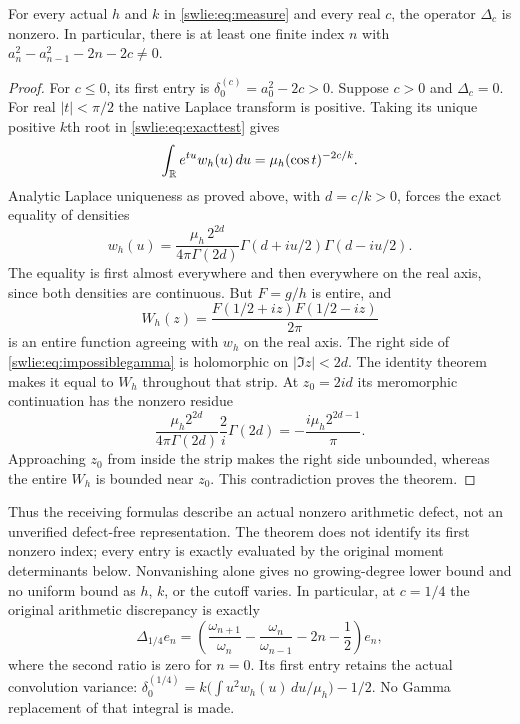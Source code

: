 \begin{swlietheorem}
\label{swlie:thm:nonzero}
For every actual $h$ and $k$ in \eqref{swlie:eq:measure} and every
real $c$, the operator $\Delta_c$ is nonzero. In particular,
there is at least one finite index $n$ with
$a_n^2-a_{n-1}^2-2n-2c\ne0$.
\end{swlietheorem}
\begin{proof}
For $c\leq0$, its first entry is
$\delta_0^{(c)}=a_0^2-2c>0$.
Suppose $c>0$ and $\Delta_c=0$.
For real $|t|<\pi/2$ the native Laplace transform is positive.
Taking its unique positive $k$th root in
\eqref{swlie:eq:exacttest} gives
\[
 \int_\mathbb R e^{tu}w_h(u)\,du
       =\mu_h(\cos t)^{-2c/k}.
\]
Analytic Laplace uniqueness as proved above, with
$d=c/k>0$, forces the exact equality of densities
\begin{equation}\label{swlie:eq:impossiblegamma}
 w_h(u)=\frac{\mu_h\,2^{2d}}{4\pi\Gamma(2d)}
                \Gamma(d+iu/2)\Gamma(d-iu/2).
\end{equation}
The equality is first almost everywhere and then everywhere
on the real axis, since both densities are continuous.
But $F=g/h$ is entire, and
\[
 W_h(z)=\frac{F(1/2+iz)F(1/2-iz)}{2\pi}
\]
is an entire function agreeing with $w_h$ on the real axis.
The right side of \eqref{swlie:eq:impossiblegamma} is holomorphic
on $|\Im z|<2d$. The identity theorem makes it equal to
$W_h$ throughout that strip. At $z_0=2id$ its meromorphic
continuation has the nonzero residue
\[
 \frac{\mu_h2^{2d}}{4\pi\Gamma(2d)}
       \frac{2}{i}\Gamma(2d)
       =-\frac{i\mu_h2^{2d-1}}{\pi}.
\]
Approaching $z_0$ from inside the strip makes the right
side unbounded, whereas the entire $W_h$ is bounded near
$z_0$. This contradiction proves the theorem.
\end{proof}

Thus the receiving formulas describe an actual nonzero
arithmetic defect, not an unverified defect-free
representation. The theorem does not identify its first
nonzero index; every entry is exactly evaluated by the
original moment determinants below. Nonvanishing alone
gives no growing-degree lower bound and no uniform bound
as $h$, $k$, or the cutoff varies.
In particular, at $c=1/4$ the original arithmetic discrepancy
is exactly
\begin{equation}\label{swlie:eq:archdefect}
 \boxed{\quad
 \Delta_{1/4}e_n=
       \left(\frac{\omega_{n+1}}{\omega_n}
        -\frac{\omega_n}{\omega_{n-1}}-2n-\frac12\right)e_n,
 \quad}
\end{equation}
where the second ratio is zero for $n=0$.
Its first entry retains the actual convolution variance:
$\delta_0^{(1/4)}
 =k\bigl(\int u^2w_h(u)\,du/\mu_h\bigr)-1/2$.
No Gamma replacement of that integral is made.

